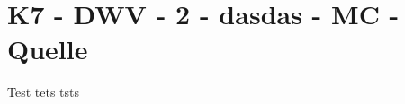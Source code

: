 \section{K7 - DWV - 2 - dasdas - MC - Quelle}

\begin{beispiel}[K7 - DWV]{1}
Test tets tsts
\end{beispiel}